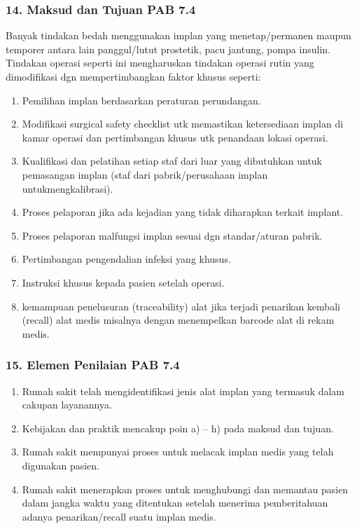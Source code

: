 \documentclass[
]{book}
\providecommand{\tightlist}{%
  \setlength{\itemsep}{0pt}\setlength{\parskip}{0pt}}
\begin{document}
\hypertarget{maksud-dan-tujuan-pab-7.4}{%
\subsubsection*{14. Maksud dan Tujuan PAB 7.4}\label{maksud-dan-tujuan-pab-7.4}}

Banyak tindakan bedah menggunakan implan yang menetap/permanen maupun temporer antara lain panggul/lutut prostetik, pacu jantung, pompa insulin. Tindakan operasi seperti ini mengharuskan tindakan operasi rutin yang dimodifikasi dgn mempertimbangkan faktor khusus seperti:

\begin{enumerate}
\def\labelenumi{\alph{enumi}.}
\tightlist
\item
  Pemilihan implan berdasarkan peraturan perundangan.
\item
  Modifikasi surgical safety checklist utk memastikan ketersediaan implan di kamar operasi dan pertimbangan khusus utk penandaan lokasi operasi.
\item
  Kualifikasi dan pelatihan setiap staf dari luar yang dibutuhkan untuk pemasangan implan (staf dari pabrik/perusahaan implan untukmengkalibrasi).
\item
  Proses pelaporan jika ada kejadian yang tidak diharapkan terkait implant.
\item
  Proses pelaporan malfungsi implan sesuai dgn standar/aturan pabrik.
\item
  Pertimbangan pengendalian infeksi yang khusus.
\item
  Instruksi khusus kepada pasien setelah operasi.
\item
  kemampuan penelusuran (traceability) alat jika terjadi penarikan kembali (recall) alat medis misalnya dengan menempelkan barcode alat di rekam medis.
\end{enumerate}

\hypertarget{elemen-penilaian-pab-7.4}{%
\subsubsection*{15. Elemen Penilaian PAB 7.4}\label{elemen-penilaian-pab-7.4}}

\begin{enumerate}
\def\labelenumi{\alph{enumi}.}
\tightlist
\item
  Rumah sakit telah mengidentifikasi jenis alat implan yang termasuk dalam cakupan layanannya.
\item
  Kebijakan dan praktik mencakup poin a) -- h) pada maksud dan tujuan.
\item
  Rumah sakit mempunyai proses untuk melacak implan medis yang telah digunakan pasien.
\item
  Rumah sakit menerapkan proses untuk menghubungi dan memantau pasien dalam jangka waktu yang ditentukan setelah menerima pemberitahuan adanya penarikan/recall suatu implan medis.
\end{enumerate}
\end{document}

